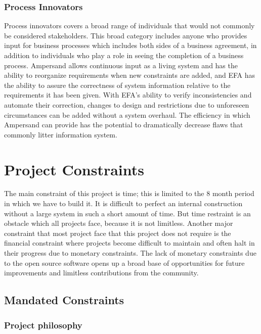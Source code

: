 \documentclass[12pt]{report}
\begin{document}
\subsection{Process Innovators}
Process innovators covers a broad range of individuals that would not commonly 
be considered stakeholders. This broad category includes anyone who provides 
input for business processes which includes both sides of a business agreement, 
in addition to individuals who play a role in seeing the completion of a 
business process. Ampersand allows continuous input as a living system and has 
the ability to reorganize requirements when new constraints are added, and 
EFA has the ability to assure the correctness of system information relative 
to the requirements it has been given. With EFA's ability to verify 
inconsistencies and automate their correction, changes to design and 
restrictions due to unforeseen circumstances can be added without a system 
overhaul. The efficiency in which Ampersand can provide has the potential to 
dramatically decrease flaws that commonly litter information system.


\chapter{Project Constraints}\label{ch:Constraints}
The main constraint of this project is time; this is limited to the 8 month 
period in which we have to build it. It is difficult to perfect an internal 
construction without a large system in such a short amount of time. But time 
restraint is an obstacle which all projects face, because it is not limitless. 
Another major constraint that most project face that this project does not 
require is the financial constraint where projects become difficult to maintain 
and often halt in their progress due to monetary constraints. The lack of 
monetary constraints due to the open source software opens up a broad base of 
opportunities for future improvements and limitless contributions from the 
community.
\section{Mandated Constraints}\label{sec:Constraints}

\subsection{Project philosophy}
\end{document}
